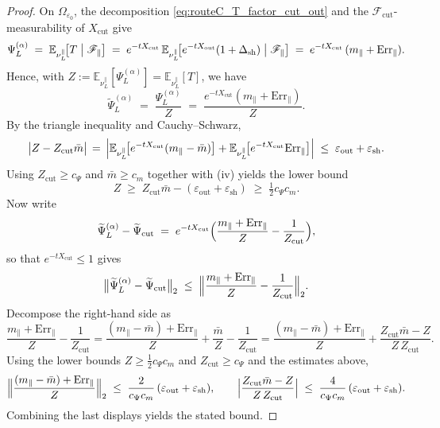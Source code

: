 \begin{proof}
On $\Omega_{\varepsilon_0}$, the decomposition \eqref{eq:routeC_T_factor_cut_out} and the $\mathscr F_{\mathrm{cut}}$-measurability of $X_{\mathrm{cut}}$
give
\[
\Psi_L^{(\alpha)} \;=\; \mathbb E_{\nu_L^{\parallel}}\!\bigl[T\bigm|\mathscr F_\parallel\bigr]
\;=\;
e^{-tX_{\mathrm{cut}}}\,
\mathbb E_{\nu_L^{\parallel}}\!\bigl[e^{-tX_{\mathrm{out}}}(1+\Delta_{\mathrm{sh}})\bigm|\mathscr F_\parallel\bigr]
\;=\;
e^{-tX_{\mathrm{cut}}}\,(m_\parallel+\mathrm{Err}_\parallel).
\]
Hence, with $Z:=\mathbb E_{\nu_L^{\parallel}}[\Psi_L^{(\alpha)}]=\mathbb E_{\nu_L^{\parallel}}[T]$, we have
\[
\widetilde\Psi_L^{(\alpha)} \;=\; \frac{\Psi_L^{(\alpha)}}{Z}
\;=\;
\frac{e^{-tX_{\mathrm{cut}}}(m_\parallel+\mathrm{Err}_\parallel)}{Z}.
\]
By the triangle inequality and Cauchy--Schwarz,
\[
\bigl| Z - Z_{\mathrm{cut}}\bar m \bigr|
\,=\,
\Bigl|
\mathbb E_{\nu_L^{\parallel}}\!\bigl[e^{-tX_{\mathrm{cut}}}(m_\parallel-\bar m)\bigr]
+
\mathbb E_{\nu_L^{\parallel}}\!\bigl[e^{-tX_{\mathrm{cut}}}\mathrm{Err}_\parallel\bigr]
\Bigr|
\;\le\;
\varepsilon_{\mathrm{out}}+\varepsilon_{\mathrm{sh}}.
\]
Using $Z_{\mathrm{cut}}\ge c_\Psi$ and $\bar m\ge c_m$ together with (iv) yields the lower bound
\[
Z \;\ge\; Z_{\mathrm{cut}}\bar m - (\varepsilon_{\mathrm{out}}+\varepsilon_{\mathrm{sh}})
\;\ge\; \tfrac12 c_\Psi c_m.
\]
Now write
\[
\widetilde\Psi_L^{(\alpha)}-\widetilde\Psi_{\mathrm{cut}}
\;=\;
e^{-tX_{\mathrm{cut}}}\Bigl(\frac{m_\parallel+\mathrm{Err}_\parallel}{Z}-\frac{1}{Z_{\mathrm{cut}}}\Bigr),
\]
so that $e^{-tX_{\mathrm{cut}}}\le 1$ gives
\[
\bigl\|\widetilde\Psi_L^{(\alpha)}-\widetilde\Psi_{\mathrm{cut}}\bigr\|_{2}
\;\le\;
\Bigl\|\frac{m_\parallel+\mathrm{Err}_\parallel}{Z}-\frac{1}{Z_{\mathrm{cut}}}\Bigr\|_{2}.
\]
Decompose the right-hand side as
\[
\frac{m_\parallel+\mathrm{Err}_\parallel}{Z}-\frac{1}{Z_{\mathrm{cut}}}
=
\frac{(m_\parallel-\bar m)+\mathrm{Err}_\parallel}{Z}
+
\frac{\bar m}{Z}-\frac{1}{Z_{\mathrm{cut}}}
=
\frac{(m_\parallel-\bar m)+\mathrm{Err}_\parallel}{Z}
+
\frac{Z_{\mathrm{cut}}\bar m-Z}{Z\,Z_{\mathrm{cut}}}.
\]
Using the lower bounds $Z\ge \tfrac12c_\Psi c_m$ and $Z_{\mathrm{cut}}\ge c_\Psi$ and the estimates above,
\[
\Bigl\|\frac{(m_\parallel-\bar m)+\mathrm{Err}_\parallel}{Z}\Bigr\|_2
\;\le\;
\frac{2}{c_\Psi c_m}\,(\varepsilon_{\mathrm{out}}+\varepsilon_{\mathrm{sh}}),
\qquad
\Bigl|\frac{Z_{\mathrm{cut}}\bar m-Z}{Z\,Z_{\mathrm{cut}}}\Bigr|
\;\le\;
\frac{4}{c_\Psi c_m}\,(\varepsilon_{\mathrm{out}}+\varepsilon_{\mathrm{sh}}).
\]
Combining the last displays yields the stated bound.
\end{proof}

